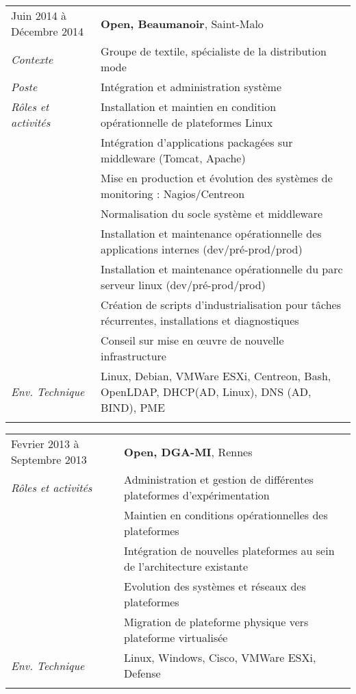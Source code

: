 \documentclass[a4paper,8pt]{article}
\begin{document}
\begin{tabular}{P{3.5cm}|p{13cm}}
Juin 2014 à Décembre 2014	& \textbf{Open, Beaumanoir}, Saint-Malo\\
\textsl{Contexte}		& Groupe de textile, spécialiste de la distribution mode\\
\textsl{Poste}			& Intégration et administration système\\
\textsl{Rôles et activités}	& Installation et maintien en condition opérationnelle de plateformes Linux\\
				& Intégration d'applications packagées sur middleware (Tomcat, Apache)\\
				& Mise en production et évolution des systèmes de monitoring : Nagios/Centreon\\
				& Normalisation du socle système et middleware\\
				& Installation et maintenance opérationnelle des applications internes (dev/pré-prod/prod)\\
				& Installation et maintenance opérationnelle du parc serveur linux (dev/pré-prod/prod)\\
				& Création de scripts d'industrialisation pour tâches récurrentes, installations et diagnostiques\\
				& Conseil sur mise en œuvre de nouvelle infrastructure\\
\textsl{Env. Technique}		& Linux, Debian, VMWare ESXi, Centreon, Bash, OpenLDAP, DHCP(AD, Linux), DNS (AD, BIND), PME\\
 & \\
\end{tabular}

\begin{tabular}{P{3.5cm}|p{13cm}}
Fevrier 2013 à Septembre 2013	& \textbf{Open, DGA-MI}, Rennes\\
\textsl{Rôles et activités}	& Administration et gestion de différentes plateformes d'expérimentation\\
				& Maintien en conditions opérationnelles des plateformes\\
				& Intégration de nouvelles plateformes au sein de l'architecture existante\\
				& Evolution des systèmes et réseaux des plateformes\\
				& Migration de plateforme physique vers plateforme virtualisée\\
\textsl{Env. Technique}		& Linux, Windows, Cisco, VMWare ESXi, Defense\\
 & \\
\end{tabular}
\end{document}
